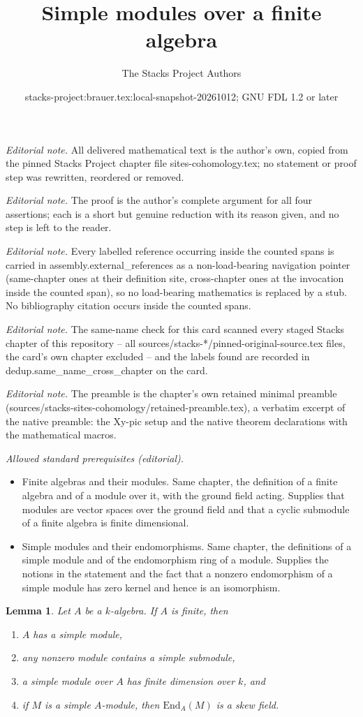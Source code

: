 \documentclass[10pt,a4paper]{amsart}
\title{Simple modules over a finite algebra}
\author{The Stacks Project Authors}
\date{stacks-project:brauer.tex:local-snapshot-20261012; GNU FDL 1.2 or later}
\theoremstyle{plain}
\newtheorem{lemma}[subsection]{Lemma}
\theoremstyle{definition}
\theoremstyle{remark}
\numberwithin{equation}{subsection}
\begin{document}
\maketitle
\noindent\textit{Editorial note.} All delivered mathematical text is the author's own, copied from the pinned Stacks Project chapter file sites-cohomology.tex; no statement or proof step was rewritten, reordered or removed.\par\medskip
\noindent\textit{Editorial note.} The proof is the author's complete argument for all four assertions; each is a short but genuine reduction with its reason given, and no step is left to the reader.\par\medskip
\noindent\textit{Editorial note.} Every labelled reference occurring inside the counted spans is carried in assembly.external\_references as a non-load-bearing navigation pointer (same-chapter ones at their definition site, cross-chapter ones at the invocation inside the counted span), so no load-bearing mathematics is replaced by a stub. No bibliography citation occurs inside the counted spans.\par\medskip
\noindent\textit{Editorial note.} The same-name check for this card scanned every staged Stacks chapter of this repository -- all sources/stacks-*/pinned-original-source.tex files, the card's own chapter excluded -- and the labels found are recorded in dedup.same\_name\_cross\_chapter on the card.\par\medskip
\noindent\textit{Editorial note.} The preamble is the chapter's own retained minimal preamble (sources/stacks-sites-cohomology/retained-preamble.tex), a verbatim excerpt of the native preamble: the Xy-pic setup and the native theorem declarations with the mathematical macros.\par\medskip
\noindent\textit{Allowed standard prerequisites (editorial).}\begin{itemize}
\item Finite algebras and their modules. Same chapter, the definition of a finite algebra and of a module over it, with the ground field acting. Supplies that modules are vector spaces over the ground field and that a cyclic submodule of a finite algebra is finite dimensional.
\item Simple modules and their endomorphisms. Same chapter, the definitions of a simple module and of the endomorphism ring of a module. Supplies the notions in the statement and the fact that a nonzero endomorphism of a simple module has zero kernel and hence is an isomorphism.
\end{itemize}\medskip
\begin{lemma}
\label{lemma-simple-module}
Let $A$ be a $k$-algebra. If $A$ is finite, then
\begin{enumerate}
\item $A$ has a simple module,
\item any nonzero module contains a simple submodule,
\item a simple module over $A$ has finite dimension over $k$, and
\item if $M$ is a simple $A$-module, then $\text{End}_A(M)$ is a
skew field.
\end{enumerate}
\end{lemma}
\end{document}
